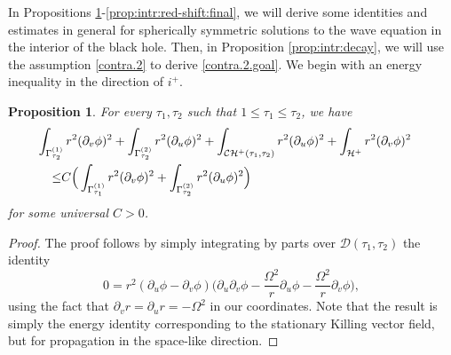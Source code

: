 \documentclass[12 pt, reqno]{amsart}
\newtheorem{proposition}[theorem]{Proposition}
\theoremstyle{definition}
\theoremstyle{remark}
\numberwithin{equation}{section}
\newcommand{\rd}{\partial}
\newcommand{\bb}{\Big}
\newcommand{\0}{\emptyset}
\newcommand{\Gmm}{\Gamma}
\newcommand{\Omg}{\Omega}
\newcommand{\calC}{\mathcal C}
\newcommand{\calD}{\mathcal D}
\newcommand{\calH}{\mathcal H}
\newcommand{\CH}{\calC \calH^{+}}		%
\newcommand{\EH}{\calH^{+}}
\begin{document}
In Propositions \ref{prop:intr:energy}-\ref{prop:intr:red-shift:final}, we will derive some identities and estimates in general for spherically symmetric solutions to the wave equation in the interior of the black hole. Then, in Proposition \ref{prop:intr:decay}, we will use the assumption \eqref{contra.2} to derive \eqref{contra.2.goal}. We begin with an energy inequality in the direction of $i^{+}$.
\begin{proposition} \label{prop:intr:energy}
For every $\tau_{1}, \tau_{2}$ such that $1 \leq \tau_{1} \leq \tau_{2}$, we have
\begin{equation} \label{eq:intr:energy}
\begin{aligned}
&\hskip-2em
	\int_{\Gmm_{\tau_{2}}^{(1)}} r^{2} (\rd_{v} \phi)^{2} + \int_{\Gmm_{\tau_{2}}^{(2)}} r^{2} (\rd_{u} \phi)^{2} 
	+ \int_{\CH(\tau_{1}, \tau_{2})} r^{2} (\rd_{u} \phi)^{2} + \int_{\EH} r^{2} (\rd_{v} \phi)^{2} \\
	\leq & C \bb( \int_{\Gmm^{(1)}_{\tau_{1}}} r^{2} (\rd_{v} \phi)^{2} + \int_{\Gmm^{(2)}_{\tau_{2}}} r^{2} (\rd_{u} \phi)^{2} \bb)
\end{aligned}
\end{equation}
for some universal $C>0$.
\end{proposition}
\begin{proof} 
The proof follows by simply integrating by parts over $\calD(\tau_{1}, \tau_{2})$ the identity
\begin{equation*}
	0 = r^{2} (\rd_{u} \phi - \rd_{v} \phi) \bb( \rd_{u} \rd_{v} \phi - \frac{\Omg^{2}}{r} \rd_{u} \phi - \frac{\Omg^{2}}{r} \rd_{v} \phi \bb),
\end{equation*} 
using the fact that $\rd_{v} r = \rd_{u} r = - \Omg^{2}$ in our coordinates. Note that the result is simply the energy identity corresponding to the stationary Killing vector field, but for propagation in the space-like direction. \qedhere
\end{proof}
\end{document}

